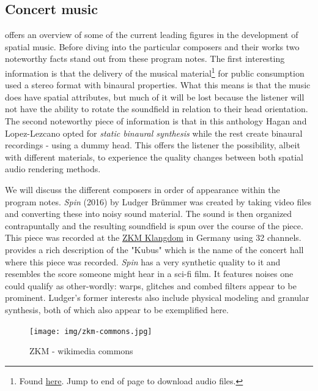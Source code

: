\subsection{Concert music} \label{subsec:concert-mus}

\cite{hagan2017sound} offers an overview of some of the current leading figures in the development of spatial music. Before diving into the particular composers and their works two noteworthy facts stand out from these program notes. The first interesting information is that the delivery of the musical material\footnote{Found \href{https://muse.jhu.edu/article/656037}{here}. Jump to end of page to download audio files.} for public consumption used a stereo format with binaural properties. What this means is that the music does have spatial attributes, but much of it will be lost because the listener will not have the ability to rotate the soundfield in relation to their head orientation. The second noteworthy piece of information is that in this anthology Hagan and Lopez-Lezcano opted for \textit{static binaural synthesis} while the rest create binaural recordings - using a dummy head. This offers the listener the possibility, albeit with different materials, to experience the quality changes between both spatial audio rendering methods.

We will discuss the different composers in order of appearance within the program notes. \textit{Spin} (2016) by Ludger Brümmer was created by taking video files and converting these into noisy sound material. The sound is then organized contrapuntally and the resulting soundfield is spun over the course of the piece. This piece was recorded at the \href{https://zkm.de/en}{ZKM Klangdom} in Germany using 32 channels. \cite{ramakrishnan2006zkm} provides a rich description of the "Kubus" which is the name of the concert hall where this piece was recorded. \textit{Spin} has a very synthetic quality to it and resembles the score someone might hear in a sci-fi film. It features noises one could qualify as other-wordly: warps, glitches and combed filters appear to be prominent. Ludger's former interests also include physical modeling and granular synthesis, both of which also appear to be exemplified here. 

\begin{figure}[ht!]%
\centering
\texttt{[image: img/zkm-commons.jpg]} 
\caption{ZKM - wikimedia commons}
\end{figure}

